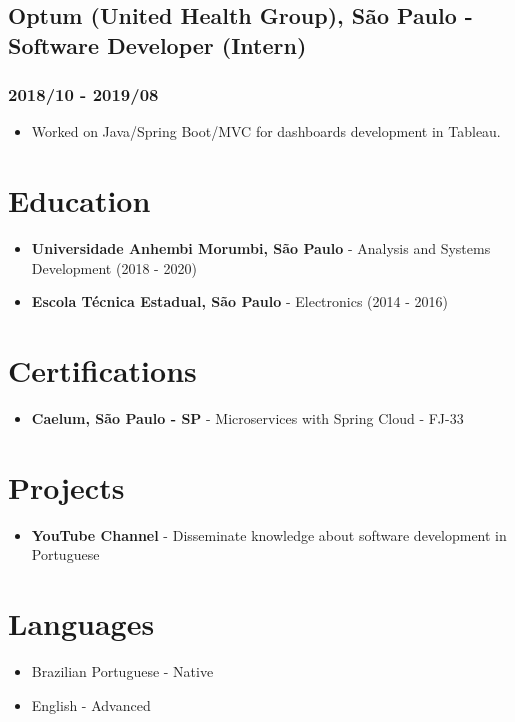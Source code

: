 \documentclass[a4paper,10pt]{article}
\begin{document}
\subsection*{Optum (United Health Group), São Paulo - Software Developer (Intern)}
\subsubsection*{2018/10 - 2019/08}
\begin{itemize}
    \item Worked on Java/Spring Boot/MVC for dashboards development in Tableau.
\end{itemize}

\section*{Education}

\begin{itemize}
    \item \textbf{Universidade Anhembi Morumbi, São Paulo} - Analysis and Systems Development (2018 - 2020)
    \item \textbf{Escola Técnica Estadual, São Paulo} - Electronics (2014 - 2016)
\end{itemize}

\section*{Certifications}
\begin{itemize}
    \item \textbf{Caelum, São Paulo - SP} - Microservices with Spring Cloud - FJ-33
\end{itemize}

\section*{Projects}
\begin{itemize}
    \item \textbf{YouTube Channel} - Disseminate knowledge about software development in Portuguese
\end{itemize}

\section*{Languages}
\begin{itemize}
    \item Brazilian Portuguese - Native
    \item English - Advanced
\end{itemize}
\end{document}
